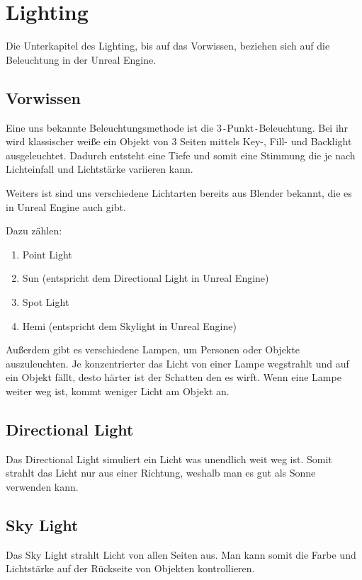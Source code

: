 \section{Lighting}
Die Unterkapitel des Lighting, bis auf das Vorwissen, beziehen sich auf die Beleuchtung in der Unreal Engine.

\subsection{Vorwissen}
Eine uns bekannte Beleuchtungsmethode ist die 3\verb+-+Punkt\verb+-+Beleuchtung. Bei ihr wird klassischer weiße ein Objekt
von 3 Seiten mittels Key-, Fill- und Backlight ausgeleuchtet. Dadurch entsteht eine Tiefe und somit eine Stimmung die je nach Lichteinfall und
Lichtstärke variieren kann.

Weiters ist sind uns verschiedene Lichtarten bereits aus Blender bekannt, die es in Unreal Engine auch gibt.

Dazu zählen:

\begin{enumerate}
    \item Point Light
    \item Sun (entspricht dem Directional Light in Unreal Engine)
    \item Spot Light
    \item Hemi (entspricht dem Skylight in Unreal Engine)
\end{enumerate}

Außerdem gibt es verschiedene Lampen, um Personen oder Objekte auszuleuchten. Je konzentrierter das Licht von einer Lampe wegstrahlt und auf ein Objekt
fällt, desto härter ist der Schatten den es wirft. Wenn eine Lampe weiter weg ist, kommt weniger Licht am Objekt an.

\subsection{Directional Light}
Das Directional Light simuliert ein Licht was unendlich weit weg ist. Somit strahlt das Licht nur aus einer Richtung, weshalb
man es gut als Sonne verwenden kann. \citep{unreal:directional_light}

\subsection{Sky Light}
Das Sky Light strahlt Licht von allen Seiten aus. Man kann somit die Farbe und Lichtstärke auf der Rückseite von Objekten kontrollieren.

